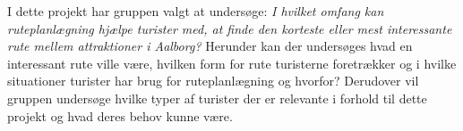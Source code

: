 I dette projekt har gruppen valgt at undersøge: \newline \textit{I hvilket omfang kan ruteplanlægning hjælpe turister med, at finde den korteste eller mest interessante rute mellem attraktioner i Aalborg?} \newline 
Herunder kan der undersøges hvad en interessant rute ville være, hvilken form for rute turisterne foretrækker og i hvilke situationer turister har brug for ruteplanlægning og hvorfor? Derudover vil gruppen undersøge hvilke typer af turister der er relevante i forhold til dette projekt og hvad deres behov kunne være. \newline 


